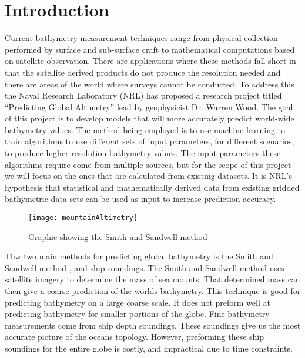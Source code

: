 \section{Introduction}

Current bathymetry measurement techniques range from physical collection performed by surface and sub-surface craft to mathematical computations based on satellite observation.  
There are applications where these methods fall short in that the satellite derived products do not produce the resolution needed and there are areas of the world where surveys cannot be conducted.  
To address this the Naval Research Laboratory (NRL) has proposed a research project titled “Predicting Global Altimetry” lead by geophysicist Dr. Warren Wood. 
The goal of this project is to develop models that will more accurately predict world-wide bathymetry values.  
The method being employed is to use machine learning to train algorithms to use different sets of input parameters, for different scenarios, to produce higher resolution bathymetry values.  
The input parameters these algorithms require come from multiple sources, but for the scope of this project we will focus on the ones that are calculated from existing datasets.  
It is NRL’s hypothesis that statistical and mathematically derived data from existing gridded bathymetric data sets can be used as input to increase prediction accuracy.

\begin{figure}[hb]
    \centering
    \texttt{[image: mountainAltimetry]}
    \caption{Graphic showing the Smith and Sandwell method}
    \label{fig1:Figure 2}
  \end{figure}

\par
Thw two main methods for predicting global bathymetry is the Smith and Sandwell method \cite{sandwell}, and ship soundings.
The Smith and Sandwell method uses satellite imagery to determine the mass of sea mounts.
That determined mass can then give a coarse prediction of the worlds bathymetry.
This technique is good for predicting bathymetry on a large coarse scale.
It does not preform well at predicting bathymetry for smaller portions of the globe.
Fine bathymetry measurements come from ship depth soundings.
These soundings give us the most accurate picture of the oceans topology.
However, preforming these ship soundings for the entire globe is costly, and impractical due to time constraints.